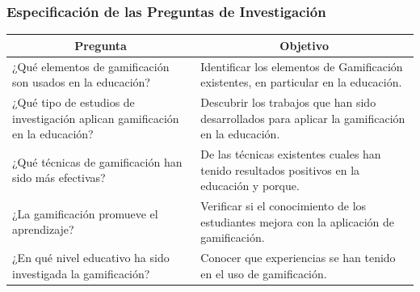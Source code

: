 \documentclass{beamer}
\begin{document}
\begin{frame}
    \frametitle{Especificación de las Preguntas de Investigación}
    \begin{table}
                \begin{center}
                    \label{table:researchQuestions}
                    \begin{tabular}{| p{5.5cm} | p{5.5cm} |}
                        \hline
                        \multicolumn{1}{|c|}{\textbf{Pregunta}}  & \multicolumn{1}{|c|}{\textbf{Objetivo}} \\
                        \hline
                        ¿Qué elementos de gamificación son usados en la educación? & Identificar los elementos de Gamificación existentes, en particular en la educación. \\
                        \hline
                        ¿Qué tipo de estudios de investigación aplican gamificación en la educación? & Descubrir los trabajos que han sido desarrollados para aplicar la gamificación en la educación. \\
                        \hline
                        ¿Qué técnicas de gamificación han sido más efectivas? & De las técnicas existentes cuales han tenido resultados positivos en la educación y porque. \\
                        \hline
                        ¿La gamificación promueve el aprendizaje? & Verificar si el conocimiento de los estudiantes mejora con la aplicación de gamificación.\\
                        \hline
                        ¿En qué nivel educativo ha sido investigada la gamificación? & Conocer que experiencias se han tenido en el uso de gamificación.\\
                        \hline
                    \end{tabular}
                \end{center}
            \end{table}
\end{frame}
\end{document}
